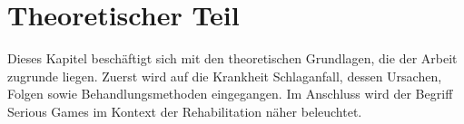 \chapter{Theoretischer Teil}\label{sec:theoretic-part}
Dieses Kapitel beschäftigt sich mit den theoretischen Grundlagen, die der Arbeit zugrunde liegen. Zuerst wird auf die Krankheit Schlaganfall, dessen Ursachen, Folgen sowie Behandlungsmethoden eingegangen. Im Anschluss wird der Begriff Serious Games im Kontext der Rehabilitation näher beleuchtet.




